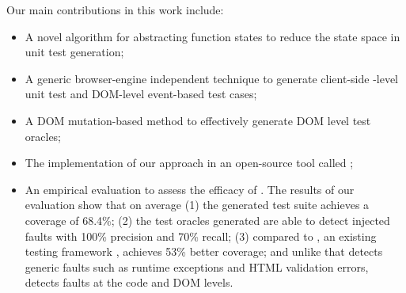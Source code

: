Our main contributions in this work include:
\begin{itemize}[noitemsep, nolistsep]
\item A novel algorithm for abstracting function states to reduce the state space in unit test generation;%
\item A generic browser-engine independent technique to generate client-side \javascript-level unit test and DOM-level event-based test cases;
\item A DOM mutation-based method to effectively generate DOM level test oracles; %
\item The implementation of our approach in an open-source tool called \tool;%
\item An empirical evaluation to assess the efficacy of \tool.
The results of our evaluation show that on average (1) the generated test suite achieves a coverage of 68.4\%;
(2) the test oracles generated are able to detect injected faults with 100\% precision and 70\% recall; (3)  
 compared to \artemis, an existing \javascript testing framework \cite{artzi:icse11}, \tool achieves 53\% better coverage; and unlike \artemis that detects generic faults such as runtime exceptions and HTML validation errors, \tool detects faults at the \javascript code and DOM levels. 
\end{itemize} 



